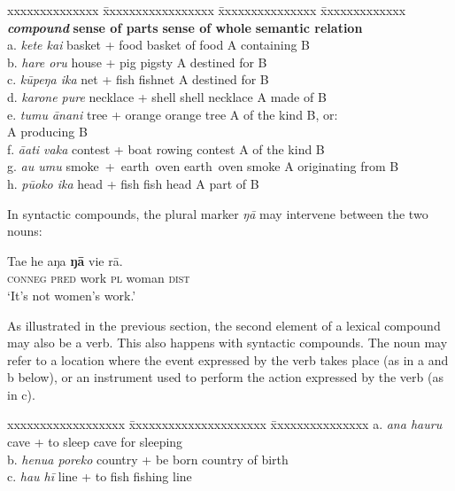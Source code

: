 \ea\label{ex:5.119}
\normalsize{
\begin{tabbing}
xxxxxxxxxxxxxx \= xxxxxxxxxxxxxxxxx \= xxxxxxxxxxxxxxx \= xxxxxxxxxxxxx \kill
 \textit{\textbf{\textup{compound}}} \> \textbf{sense of parts} \> \textbf{sense of whole} \> \textbf{semantic relation}\\
 a. \textit{kete kai} \> basket + food \> basket of food \> A containing B \\
 b. \textit{hare oru} \> house + pig \> pigsty \> A destined for B\\
 c. \textit{kūpeŋa ika} \> net + fish \> fishnet \> A destined for B\\
 d. \textit{karone pure} \> necklace + shell \> shell necklace \> A made of B\\
 e. \textit{tumu {\ꞌ}ānani} \> tree + orange \> orange tree \> A of the kind B, or:\\
\> \> \> A producing B\\
 f. \textit{{\ꞌ}ā{\ꞌ}ati vaka} \> contest + boat \> rowing contest \> A of the kind B\\
 g. \textit{{\ꞌ}au {\ꞌ}umu} \> smoke~+~earth~oven \> earth~oven smoke \> A originating from B\\
 h. \textit{pū{\ꞌ}oko ika} \> head + fish \> fish head \> A part of B
\end{tabbing}
}
\z
In syntactic compounds, the plural marker \textit{ŋā} may intervene between the two nouns:

\ea\label{ex:5.120}
\gll Ta{\ꞌ}e he aŋa \textbf{ŋā} vi{\ꞌ}e rā. \\
\textsc{conneg} \textsc{pred} work \textsc{pl} woman \textsc{dist} \\

\glt 
‘It’s not women’s work.’ \textstyleExampleref{[R347.103]}  
\z

As illustrated in the previous section, the second element of a lexical compound may also be a verb. This also happens with syntactic compounds. The noun may refer to a location where the event expressed by the verb takes place (as in a and b below), or an instrument used to perform the action expressed by the verb (as in c).

\ea\label{ex:5.121}
\begin{tabbing}
xxxxxxxxxxxxxxxxxx \= xxxxxxxxxxxxxxxxxxxxx \= xxxxxxxxxxxxxxx \kill
  a. \textit{{\ꞌ}ana ha{\ꞌ}uru} \> cave + to sleep  \> cave for sleeping\\
  b. \textit{henua poreko}   \> country + be born   \> country of birth\\
  c. \textit{hau hī}   \> line + to fish   \> fishing line
\end{tabbing}
\z

